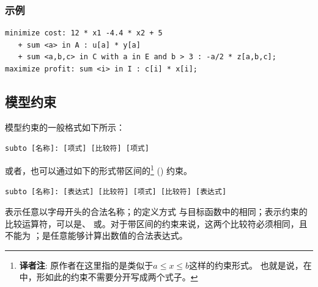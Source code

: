 \subsubsection{示例}
{\small
\begin{verbatim}
minimize cost: 12 * x1 -4.4 * x2 + 5
   + sum <a> in A : u[a] * y[a]
   + sum <a,b,c> in C with a in E and b > 3 : -a/2 * z[a,b,c];
maximize profit: sum <i> in I : c[i] * x[i];
\end{verbatim}
}

\subsection{模型约束}\label{ssec:ug:constraints}
模型约束的一般格式如下所示：

\smallskip
\verb|subto [名称]: [项式] [比较符] [项式]|

\smallskip
\noindent \noindent 或者，也可以通过如下的形式带区间的\footnote{
  \textbf{译者注}: 原作者在这里指的是类似于$a \le x \le b$这样的约束形式。
  也就是说，在\zimpl 中，形如此的约束不需要分开写成两个式子。
} () 约束。

\smallskip
\verb|subto [名称]: [表达式] [比较符] [项式] [比较符] [表达式]|

\smallskip
\noindent \code{[名称]}表示任意以字母开头的合法名称；\code{[项式]}的定义方式
与目标函数中的相同；\code{[比较符]}表示约束的比较运算符，可以是\code{<=}、
\code{>=}或\code{==}。对于带区间的约束来说，这两个比较符必须相同，且不能为
\code{==}；\code{[表达式]}是任意能够计算出数值的合法表达式。


